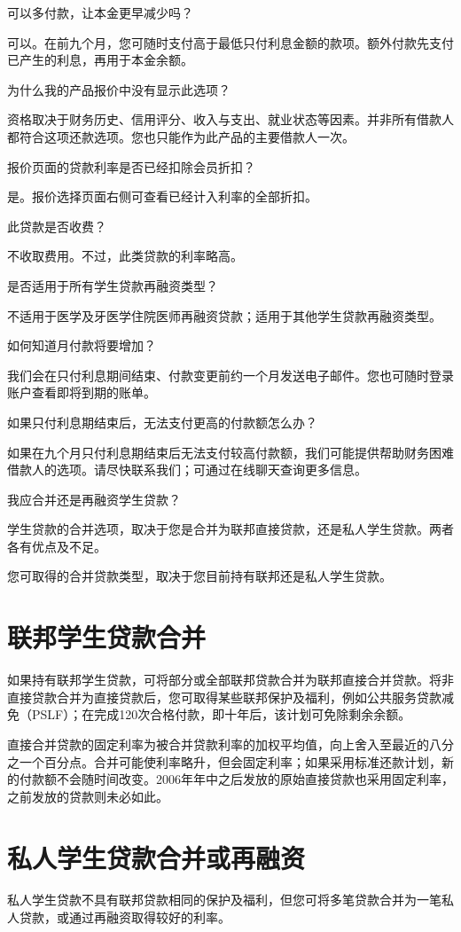 \documentclass[UTF8,fontset=none,11pt,a4paper]{ctexart}
\begin{document}
可以多付款，让本金更早减少吗？


可以。在前九个月，您可随时支付高于最低只付利息金额的款项。额外付款先支付已产生的利息，再用于本金余额。


为什么我的产品报价中没有显示此选项？


资格取决于财务历史、信用评分、收入与支出、就业状态等因素。并非所有借款人都符合这项还款选项。您也只能作为此产品的主要借款人一次。


报价页面的贷款利率是否已经扣除会员折扣？


是。报价选择页面右侧可查看已经计入利率的全部折扣。


此贷款是否收费？


不收取费用。不过，此类贷款的利率略高。


是否适用于所有学生贷款再融资类型？


不适用于医学及牙医学住院医师再融资贷款；适用于其他学生贷款再融资类型。


如何知道月付款将要增加？


我们会在只付利息期间结束、付款变更前约一个月发送电子邮件。您也可随时登录账户查看即将到期的账单。


如果只付利息期结束后，无法支付更高的付款额怎么办？


如果在九个月只付利息期结束后无法支付较高付款额，我们可能提供帮助财务困难借款人的选项。请尽快联系我们；可通过在线聊天查询更多信息。


我应合并还是再融资学生贷款？


学生贷款的合并选项，取决于您是合并为联邦直接贷款，还是私人学生贷款。两者各有优点及不足。


您可取得的合并贷款类型，取决于您目前持有联邦还是私人学生贷款。


\section*{联邦学生贷款合并}
如果持有联邦学生贷款，可将部分或全部联邦贷款合并为联邦直接合并贷款。将非直接贷款合并为直接贷款后，您可取得某些联邦保护及福利，例如公共服务贷款减免（PSLF）；在完成120次合格付款，即十年后，该计划可免除剩余余额。


直接合并贷款的固定利率为被合并贷款利率的加权平均值，向上舍入至最近的八分之一个百分点。合并可能使利率略升，但会固定利率；如果采用标准还款计划，新的付款额不会随时间改变。2006年年中之后发放的原始直接贷款也采用固定利率，之前发放的贷款则未必如此。


\section*{私人学生贷款合并或再融资}
私人学生贷款不具有联邦贷款相同的保护及福利，但您可将多笔贷款合并为一笔私人贷款，或通过再融资取得较好的利率。
\end{document}
